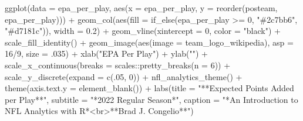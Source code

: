\documentclass[
  letterpaper,
]{krantz}
\newenvironment{Shaded}{\begin{snugshade}}{\end{snugshade}}
\newcommand{\AttributeTok}[1]{\textcolor[rgb]{0.40,0.45,0.13}{#1}}
\newcommand{\DecValTok}[1]{\textcolor[rgb]{0.68,0.00,0.00}{#1}}
\newcommand{\FloatTok}[1]{\textcolor[rgb]{0.68,0.00,0.00}{#1}}
\newcommand{\FunctionTok}[1]{\textcolor[rgb]{0.28,0.35,0.67}{#1}}
\newcommand{\NormalTok}[1]{\textcolor[rgb]{0.00,0.23,0.31}{#1}}
\newcommand{\SpecialCharTok}[1]{\textcolor[rgb]{0.37,0.37,0.37}{#1}}
\newcommand{\StringTok}[1]{\textcolor[rgb]{0.13,0.47,0.30}{#1}}
\begin{document}
\begin{Shaded}
\begin{Highlighting}[]
\FunctionTok{ggplot}\NormalTok{(}\AttributeTok{data =}\NormalTok{ epa\_per\_play, }\FunctionTok{aes}\NormalTok{(}\AttributeTok{x =}\NormalTok{ epa\_per\_play,}
                                \AttributeTok{y =} \FunctionTok{reorder}\NormalTok{(posteam, epa\_per\_play))) }\SpecialCharTok{+}
  \FunctionTok{geom\_col}\NormalTok{(}\FunctionTok{aes}\NormalTok{(}\AttributeTok{fill =} \FunctionTok{if\_else}\NormalTok{(epa\_per\_play }\SpecialCharTok{\textgreater{}=} \DecValTok{0}\NormalTok{,}
                              \StringTok{"\#2c7bb6"}\NormalTok{, }\StringTok{"\#d7181c"}\NormalTok{)),}
           \AttributeTok{width =} \FloatTok{0.2}\NormalTok{) }\SpecialCharTok{+}
  \FunctionTok{geom\_vline}\NormalTok{(}\AttributeTok{xintercept =} \DecValTok{0}\NormalTok{, }\AttributeTok{color =} \StringTok{"black"}\NormalTok{) }\SpecialCharTok{+}
  \FunctionTok{scale\_fill\_identity}\NormalTok{() }\SpecialCharTok{+}
  \FunctionTok{geom\_image}\NormalTok{(}\FunctionTok{aes}\NormalTok{(}\AttributeTok{image =}\NormalTok{ team\_logo\_wikipedia),}
             \AttributeTok{asp =} \DecValTok{16}\SpecialCharTok{/}\DecValTok{9}\NormalTok{, }\AttributeTok{size =}\NormalTok{ .}\DecValTok{035}\NormalTok{) }\SpecialCharTok{+}
  \FunctionTok{xlab}\NormalTok{(}\StringTok{"EPA Per Play"}\NormalTok{) }\SpecialCharTok{+}
  \FunctionTok{ylab}\NormalTok{(}\StringTok{""}\NormalTok{) }\SpecialCharTok{+}
  \FunctionTok{scale\_x\_continuous}\NormalTok{(}\AttributeTok{breaks =}\NormalTok{ scales}\SpecialCharTok{::}\FunctionTok{pretty\_breaks}\NormalTok{(}\AttributeTok{n =} \DecValTok{6}\NormalTok{)) }\SpecialCharTok{+}
  \FunctionTok{scale\_y\_discrete}\NormalTok{(}\AttributeTok{expand =} \FunctionTok{c}\NormalTok{(.}\DecValTok{05}\NormalTok{, }\DecValTok{0}\NormalTok{)) }\SpecialCharTok{+}
  \FunctionTok{nfl\_analytics\_theme}\NormalTok{() }\SpecialCharTok{+}
  \FunctionTok{theme}\NormalTok{(}\AttributeTok{axis.text.y =} \FunctionTok{element\_blank}\NormalTok{()) }\SpecialCharTok{+}
  \FunctionTok{labs}\NormalTok{(}\AttributeTok{title =} \StringTok{"**Expected Points Added per Play**"}\NormalTok{,}
       \AttributeTok{subtitle =} \StringTok{"*2022 Regular Season*"}\NormalTok{,}
       \AttributeTok{caption =} \StringTok{"*An Introduction to NFL Analytics with R*\textless{}br\textgreater{}**Brad J. Congelio**"}\NormalTok{)}
\end{Highlighting}
\end{Shaded}
\end{document}
